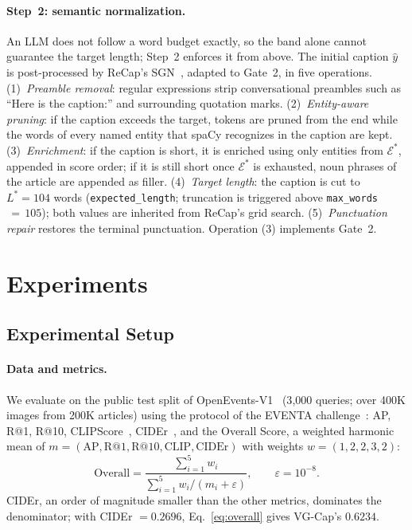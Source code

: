 \documentclass[runningheads]{llncs}
\DeclareRobustCommand{\aciids}[1]{{\color{olive}#1}}
\DeclareRobustCommand{\revise}[1]{{\color{olive}#1}}
\DeclareRobustCommand{\aciids}[1]{#1}
\DeclareRobustCommand{\revise}[1]{#1}
\begin{document}
\paragraph{\aciids{Step~2: semantic normalization.}} \aciids{An LLM does not follow a word budget exactly, so the band alone cannot guarantee the target length; Step~2 enforces it from above. The initial caption $\hat{y}$ is post-processed by ReCap's SGN~\cite{recap}, adapted to Gate~2, in five operations. (1)~\emph{Preamble removal}: regular expressions strip conversational preambles such as ``Here is the caption:'' and surrounding quotation marks. (2)~\emph{Entity-aware pruning}: if the caption exceeds the target, tokens are pruned from the end \revise{while the words of every named entity that spaCy recognizes in the caption are kept}. (3)~\emph{Enrichment}: if the caption is short, it is enriched using only entities from $\mathcal{E}^{*}$, appended in score order\revise{; if it is still short once $\mathcal{E}^{*}$ is exhausted, noun phrases of the article are appended as filler}. (4)~\emph{Target length}: the caption is cut to $L^{*}{=}104$ words (\texttt{expected\_length}; truncation is triggered above \texttt{max\_words}$\,{=}\,105$); both values are inherited from ReCap's grid search. (5)~\emph{Punctuation repair} restores the terminal punctuation. \revise{Operation (3) implements Gate~2.}}


\section{Experiments}
\label{sec:experiments}

\subsection{Experimental Setup}
\label{sec:setup}

\paragraph{Data and metrics.}
We evaluate on the public test split of OpenEvents-V1~\cite{nguyen2025openevents} (3{,}000 queries; over 400K images from 200K articles) using the protocol of the EVENTA challenge~\cite{eventa_challenge}: AP, R@1, R@10, CLIPScore~\cite{hessel2021clipscore}, CIDEr~\cite{vedantam2015cider}, and the Overall Score, \revise{a weighted harmonic mean of $m=(\mathrm{AP},\mathrm{R@1},\mathrm{R@10},\mathrm{CLIP},\mathrm{CIDEr})$ with weights $w=(1,2,2,3,2)$:
\begin{equation}
\mathrm{Overall}=\frac{\sum_{i=1}^{5}w_i}{\sum_{i=1}^{5}w_i/(m_i+\varepsilon)},\qquad \varepsilon=10^{-8}.
\label{eq:overall}
\end{equation}
CIDEr, an order of magnitude smaller than the other metrics, dominates the denominator; with CIDEr $=0.2696$, Eq.~\eqref{eq:overall} gives VG-Cap's $0.6234$.}
\end{document}
